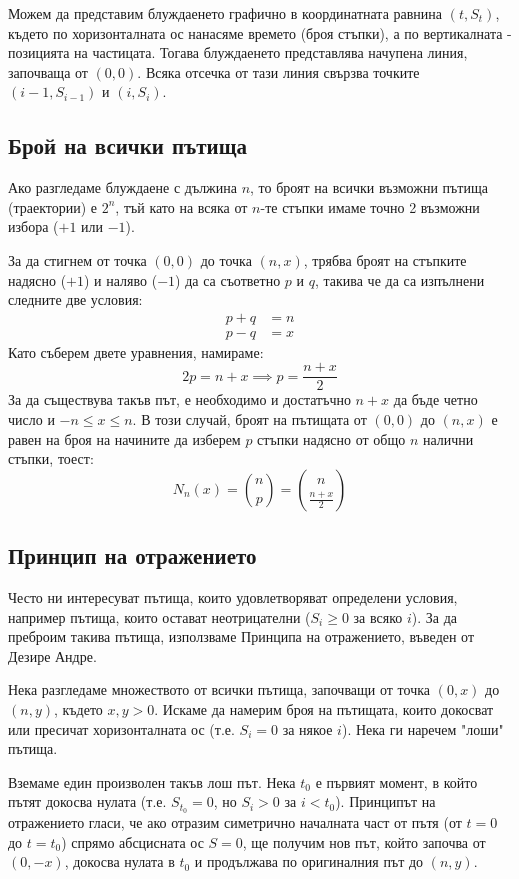 \documentclass[12pt]{article}
\begin{document}
Можем да представим блуждаенето графично в координатната равнина $(t, S_t)$, където по хоризонталната ос нанасяме времето (броя стъпки), а по вертикалната - позицията на частицата. Тогава блуждаенето представлява начупена линия, започваща от $(0,0)$. Всяка отсечка от тази линия свързва точките $(i-1, S_{i-1})$ и $(i, S_i)$.

\subsection{Брой на всички пътища}
Ако разгледаме блуждаене с дължина $n$, то броят на всички възможни пътища (траектории) е $2^n$, тъй като на всяка от $n$-те стъпки имаме точно 2 възможни избора ($+1$ или $-1$).

За да стигнем от точка $(0,0)$ до точка $(n, x)$, трябва броят на стъпките надясно ($+1$) и наляво ($-1$) да са съответно $p$ и $q$, такива че да са изпълнени следните две условия:
\begin{align*}
p + q &= n \\
p - q &= x
\end{align*}
Като съберем двете уравнения, намираме:
\[ 2p = n + x \implies p = \frac{n+x}{2} \]
За да съществува такъв път, е необходимо и достатъчно $n+x$ да бъде четно число и $-n \leq x \leq n$.
В този случай, броят на пътищата от $(0,0)$ до $(n,x)$ е равен на броя на начините да изберем $p$ стъпки надясно от общо $n$ налични стъпки, тоест:
\[ N_n(x) = \binom{n}{p} = \binom{n}{\frac{n+x}{2}} \]

\subsection{Принцип на отражението}
Често ни интересуват пътища, които удовлетворяват определени условия, например пътища, които остават неотрицателни ($S_i \geq 0$ за всяко $i$). За да преброим такива пътища, използваме Принципа на отражението, въведен от Дезире Андре.

Нека разгледаме множеството от всички пътища, започващи от точка $(0,x)$ до $(n,y)$, където $x, y > 0$. Искаме да намерим броя на пътищата, които докосват или пресичат хоризонталната ос (т.е. $S_i = 0$ за някое $i$). Нека ги наречем "лоши" пътища.

Вземаме един произволен такъв лош път. Нека $t_0$ е първият момент, в който пътят докосва нулата (т.е. $S_{t_0} = 0$, но $S_i > 0$ за $i < t_0$). Принципът на отражението гласи, че ако отразим симетрично началната част от пътя (от $t=0$ до $t=t_0$) спрямо абсцисната ос $S=0$, ще получим нов път, който започва от $(0,-x)$, докосва нулата в $t_0$ и продължава по оригиналния път до $(n,y)$. 
\end{document}
